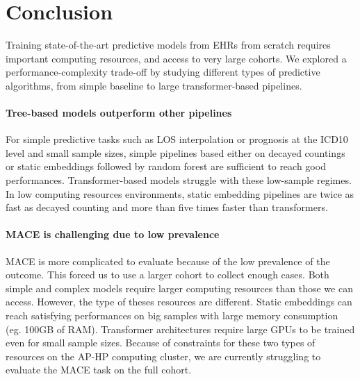 \documentclass[french,12pt,twoside,a4paper]{book}
\begin{document}


\section{Conclusion}\label{sec:predictive_models:conclusion}

Training state-of-the-art predictive models from EHRs from scratch requires
important computing resources, and access to very large cohorts. We explored a
performance-complexity trade-off by studying different types of predictive
algorithms, from simple baseline to large transformer-based pipelines.

\paragraph{Tree-based models outperform other pipelines}
For simple predictive tasks such as LOS interpolation or prognosis at the ICD10 level and
small sample sizes, simple pipelines based either on decayed countings or static
embeddings followed by random forest are sufficient to reach good performances.
Transformer-based models struggle with these low-sample regimes. In low
computing resources environments, static embedding pipelines are twice as fast
as decayed counting and more than five times faster than transformers.


\paragraph{MACE is challenging due to low prevalence}
MACE is more complicated to evaluate because of the low prevalence of the
outcome. This forced us to use a larger cohort to collect enough cases. Both
simple and complex models require larger computing resources than those we can
access. However, the type of theses resources are different. Static embeddings
can reach satisfying performances on big samples with large memory consumption
(eg. 100GB of RAM). Transformer architectures require large GPUs to be trained
even for small sample sizes. Because of constraints for these two types of
resources on the AP-HP computing cluster, we are currently struggling to
evaluate the MACE task on the full cohort.
\end{document}
